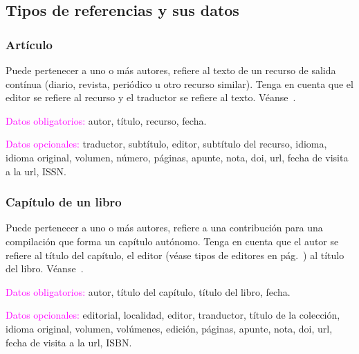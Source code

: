 \documentclass{book}
\begin{document}
{{{{{{{{{{{{{{{{{\subsection{Tipos de referencias y sus datos}

\subsubsection{Artículo}

Puede pertenecer a uno o más autores, refiere al texto de un recurso de salida contínua (diario, revista, periódico u otro recurso similar). Tenga en cuenta que el editor se refiere al recurso y el traductor se refiere al texto. Véanse~\textcite{Martin2018}.%

\begin{compactdesc}
\item [\textcolor{magenta}{Datos obligatorios:}] autor, título, recurso, fecha.
\item [\textcolor{magenta}{Datos opcionales:}] traductor, subtítulo, editor, subtítulo del recurso, idioma, idioma original, volumen, número, páginas, apunte, nota, doi, url, fecha de visita a la url, ISSN.
\end{compactdesc}

\begin{mdframed}[linewidth=.5pt,linecolor=black!30,roundcorner=3pt,backgroundcolor=yellow!15]
\noindent\vspace{-12pt}
\printbibliography[keyword=article,heading=none]
\end{mdframed}

\subsubsection{Capítulo de un libro}

Puede pertenecer a uno o más autores, refiere a una contribución para una compilación que forma un capítulo autónomo. Tenga en cuenta que el autor se refiere al título del capítulo, el editor (véase tipos de editores en pág.~\pageref{tipos-de-editores}) al título del libro. Véanse~\textcite{Reynaud1971,pozzinigra}.

\begin{compactdesc}
\item [\textcolor{magenta}{Datos obligatorios:}] autor, título del capítulo, título del libro, fecha.
\item [\textcolor{magenta}{Datos opcionales:}] editorial, localidad, editor, tranductor, título de la colección, idioma original, volumen, volúmenes, edición, páginas, apunte, nota, doi, url, fecha de visita a la url, ISBN.
\end{compactdesc}

}}}}}}}}}}}}}}}}}
\end{document}
